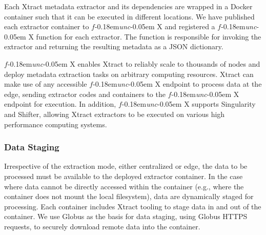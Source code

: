 \documentclass[sigconf]{acmart}
\newcommand{\kyle}[1]{}
\newcommand{\ryan}[1]{}
\newcommand{\kyle}[1]{{\textcolor{purple}{ Kyle: #1 }}}
\newcommand{\ryan}[1]{{\textcolor{magenta}{ Ryan: #1 }}}
\newcommand{\name}{Xtract}
\newcommand{\funcx}{$f$\kern-0.18em\emph{unc}\kern-0.05em X}
\begin{document}


Each \name{} metadata extractor and its dependencies are wrapped in a Docker container
such that it can be executed in different locations. 
We have published each extractor container to \funcx{} and registered a \funcx{} function for 
each extractor. The function is responsible for invoking the extractor and returning the 
resulting metadata as a JSON dictionary. 

\funcx{} enables \name{} to reliably scale to thousands of nodes and deploy 
metadata extraction tasks on arbitrary computing resources. 
\name{} can make use of any accessible \funcx{} endpoint to process data at the edge, 
sending extractor codes and containers to the \funcx{} endpoint for execution. In addition, 
\funcx{} supports Singularity and Shifter, allowing \name{} extractors to be executed
on various high performance computing systems. 


\subsubsection{Data Staging}

Irrespective of the extraction mode, either centralized or edge, the data
to be processed must be available to the deployed extractor container. 
In the case where data cannot be directly accessed within the container 
(e.g., where the container does not mount the local filesystem),
data are dynamically staged for processing. Each container includes
\name{} tooling to stage data in and out of the container. We use Globus as the 
basis for data staging, using Globus HTTPS requests, to securely download
remote data into the container. 
\end{document}
